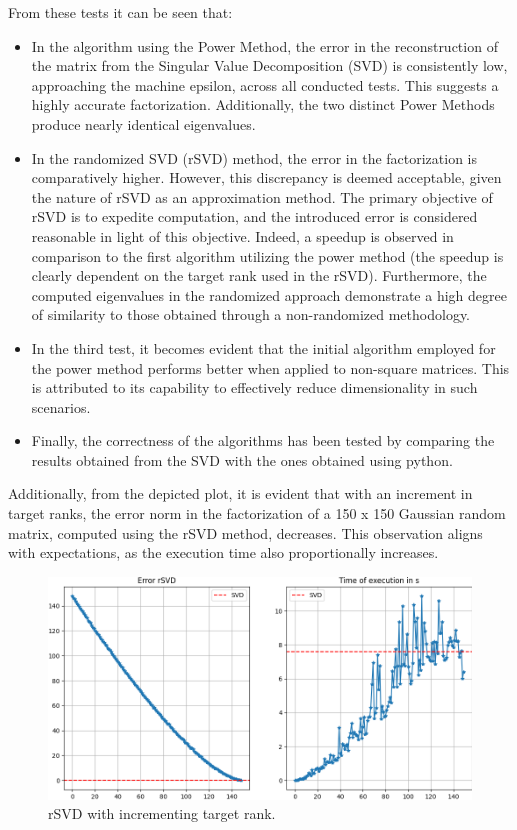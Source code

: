 \documentclass{article}
\begin{document}
From these tests it can be seen that:
\begin{itemize}
\item In the algorithm using the Power Method, the error in the reconstruction of the matrix from the Singular Value Decomposition (SVD) is consistently low, approaching the machine epsilon, across all conducted tests. This suggests a highly accurate factorization. Additionally, the two distinct Power Methods produce nearly identical eigenvalues.

\item In the randomized SVD (rSVD) method, the error in the factorization is comparatively higher. However, this discrepancy is deemed acceptable, given the nature of rSVD as an approximation method. The primary objective of rSVD is to expedite computation, and the introduced error is considered reasonable in light of this objective. Indeed, a speedup is observed in comparison to the first algorithm utilizing the power method (the speedup is clearly dependent on the target rank used in the rSVD). Furthermore, the computed eigenvalues in the randomized approach demonstrate a high degree of similarity to those obtained through a non-randomized methodology.

\item In the third test, it becomes evident that the initial algorithm employed for the power method performs better when applied to non-square matrices. This is attributed to its capability to effectively reduce dimensionality in such scenarios.

\item Finally, the correctness of the algorithms has been tested by comparing the results obtained from the SVD with the ones obtained using python.

\end{itemize}

Additionally, from the depicted plot, it is evident that with an increment in target ranks, the error norm in the factorization of a 150 x 150 Gaussian random matrix, computed using the rSVD method, decreases. This observation aligns with expectations, as the execution time also proportionally increases.

\begin{figure}[h]
    \centering
    \includegraphics[width=0.55\linewidth]{rsvd.png}
    \caption{\label{pca1}rSVD with incrementing target rank.}
    \end{figure}
\end{document}
